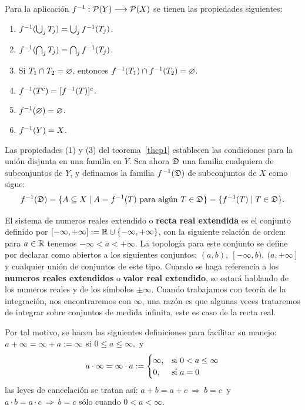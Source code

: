 \begin{thm}\label{thcp1}Para la aplicación $\ff :{\cal{P}} (Y)
\To {\cal{P}} (X)$ se tienen las propiedades siguientes:
\begin{enumerate}
    \vspace{-6pt} \item $f^{-1}(\bigcup_j T_j) = \bigcup_j
    f^{-1}(T_j)$.
    \vspace{-6pt} \item $f^{-1}(\bigcap_j T_j) = \bigcap_j
    f^{-1}(T_j)$.
    \vspace{-6pt} \item Si $T_1\cap T_2=\varnothing$, entonces
    $f^{-1}(T_1)\cap f^{-1}(T_2) = \varnothing$.
    \vspace{-6pt} \item $f^{-1}(T^c) = [f^{-1}(T)]^c$.
    \vspace{-6pt} \item $f^{-1}(\varnothing) = \varnothing$.
    \vspace{-6pt} \item $f^{-1}(Y) = X$.
\end{enumerate}
\end{thm}


Las propiedades (1) y (3) del teorema~\ref{thcp1} establecen las
condiciones para la unión disjunta en una familia en $Y$. Sea ahora
$\mathfrak{D}$ una familia cualquiera de subconjuntos de $Y$, y definamos la
familia $f^{-1} (\mathfrak{D})$ de subconjuntos de $X$ como
sigue:\begin{equation}\label{eq1}
    f^{-1}(\mathfrak{D}) = \{A\subseteq X \mid
A = f^{-1}(T) \mbox{ para algún } T\in \mathfrak{D}\} = \{f^{-1}(T) \mid T\in
\mathfrak{D}\}.
\end{equation}

El sistema de numeros reales extendido o \textbf{recta real
extendida} es el conjunto definido por $[-\infty,+\infty]:=\mathbb{R} \cup \{-\infty,
+\infty\}$, con la siguiente relación de orden: para $a\in \mathbb{R}$
tenemos $-\infty <a< +\infty$. La topología para este conjunto se
define por declarar como abiertos a los siguientes conjuntos:
$(a,b),\ [-\infty,b),\ (a,+\infty]$ y cualquier unión de conjuntos
de este tipo. Cuando se haga referencia a los \textbf{numeros reales
extendidos} o \textbf{valor real extendido}, se estará hablando de
los numeros reales y de los símbolos $\pm\infty$. Cuando trabajamos
con teoría de la integración, nos encontraremos con $\infty$, una
razón es que algunas veces trataremos de integrar sobre conjuntos de
medida infinita, este es caso de la recta real.

Por tal motivo, se hacen las siguientes definiciones para
facilitar su manejo: $a+\infty = \infty+a := \infty$ si $0\leq a
\leq \infty$,~y
\begin{equation}\label{eq4}
    a\cdot \infty = \infty \cdot a
:=\begin{cases}
  \infty, & \mbox{si } 0 < a \leq \infty \\
  0, & \mbox{si } a = 0 \\
\end{cases}
\end{equation}las leyes de cancelación se tratan
así: $a+b = a+c\ \Rightarrow\ b=c\ $ y $a\cdot b =a\cdot c\
\Rightarrow\ b=c$ sólo cuando $0 < a < \infty$. 

